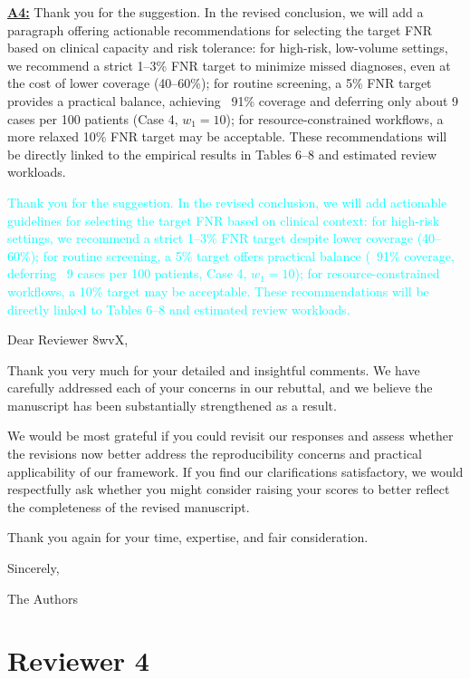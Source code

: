\documentclass[UTF8,12pt]{article}
\begin{document}
\underline{{\bf A4:}} Thank you for the suggestion. In the revised conclusion, we will add a paragraph offering actionable recommendations for selecting the target FNR based on clinical capacity and risk tolerance: for high-risk, low-volume settings, we recommend a strict 1–3\% FNR target to minimize missed diagnoses, even at the cost of lower coverage (40–60\%); for routine screening, a 5\% FNR target provides a practical balance, achieving ~91\% coverage and deferring only about 9 cases per 100 patients (Case 4, \(w_1=10\)); for resource-constrained workflows, a more relaxed 10\% FNR target may be acceptable. These recommendations will be directly linked to the empirical results in Tables 6–8 and estimated review workloads.

\textcolor{cyan}{Thank you for the suggestion. In the revised conclusion, we will add actionable guidelines for selecting the target FNR based on clinical context: for high-risk settings, we recommend a strict 1–3\% FNR target despite lower coverage (40–60\%); for routine screening, a 5\% target offers practical balance (~91\% coverage, deferring ~9 cases per 100 patients, Case 4, \(w_1=10\)); for resource-constrained workflows, a 10\% target may be acceptable. These recommendations will be directly linked to Tables 6–8 and estimated review workloads.}

\newpage

Dear Reviewer 8wvX,

Thank you very much for your detailed and insightful comments. We have carefully addressed each of your concerns in our rebuttal, and we believe the manuscript has been substantially strengthened as a result.

We would be most grateful if you could revisit our responses and assess whether the revisions now better address the reproducibility concerns and practical applicability of our framework. If you find our clarifications satisfactory, we would respectfully ask whether you might consider raising your scores to better reflect the completeness of the revised manuscript.

Thank you again for your time, expertise, and fair consideration.

Sincerely,

The Authors

\newpage

\section*{Reviewer 4}
\end{document}
